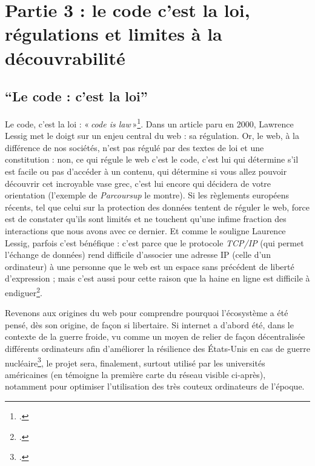 

\part{Partie 3 : le code c'est la loi, régulations et limites à la découvrabilité}

\chapter*{\enquote{Le code : c'est la loi}}

Le code, c’est la loi : « \textit{code is law} »\footcite[(nous avons consulté la version française disponible sur Framablog)]{lessig_code_2000}. Dans un article paru en 2000, Lawrence Lessig met le doigt sur un enjeu central du web : sa régulation. Or, le web, à la différence de nos sociétés, n’est pas régulé par des textes de loi et une constitution : non, ce qui régule le web c’est le code, c’est lui qui détermine s’il est facile ou pas d’accéder à un contenu, qui détermine si vous allez pouvoir découvrir cet incroyable vase grec, c’est lui encore qui décidera de votre orientation (l’exemple de \textit{Parcoursup} le montre). Si les règlements européens récents, tel que celui sur la protection des données tentent de réguler le web, force est de constater qu’ils sont limités et ne touchent qu’une infime fraction des interactions que nous avons avec ce dernier. Et comme le souligne Laurence Lessig, parfois c’est bénéfique : c’est parce que le protocole \textit{TCP/IP} (qui permet l’échange de données) rend difficile d’associer une adresse IP (celle d’un ordinateur) à une personne que le web est un espace sans précédent de liberté d’expression ; mais c’est aussi pour cette raison que la haine en ligne est difficile à endiguer\footcite[§8 et § 9]{lessig_code_2000}.

Revenons aux origines du web pour comprendre pourquoi l’écosystème a été pensé, dès son origine, de façon si libertaire. Si internet a d’abord été, dans le contexte de la guerre froide, vu comme un moyen de relier de façon décentralisée différents ordinateurs afin d’améliorer la résilience des États-Unis en cas de guerre nucléaire\footcite{2024i}, le projet sera, finalement, surtout utilisé par les universités américaines (en témoigne la première carte du réseau visible ci-après), notamment pour optimiser l’utilisation des très couteux ordinateurs de l’époque.


